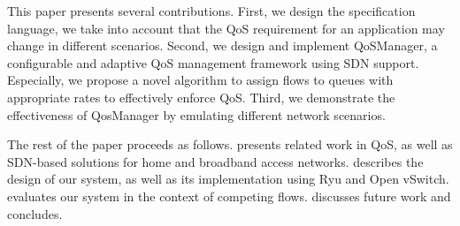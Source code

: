 This paper presents several contributions. First, we design the specification language,  we take into account
that the QoS requirement for an application may change in different scenarios. Second, we design and implement
QoSManager, a configurable and adaptive QoS management framework using SDN support. Especially, we propose a novel
algorithm to assign flows to queues with appropriate rates to effectively enforce QoS. Third, we demonstrate the
effectiveness of QosManager by emulating different network scenarios.

The rest of the paper proceeds as follows. 
 presents related work in QoS, as well as SDN-based solutions
for home and broadband access networks. 
 describes the design of our system, as well as its implementation using Ryu and Open vSwitch.
 evaluates
our system in the
context of competing flows.  discusses future work
and concludes.
